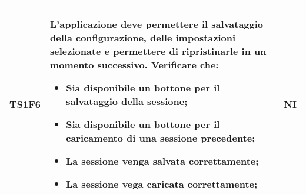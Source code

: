 \begin{tabular}{|p{2cm}|p{4cm}|p{4cm}|}
        TS1F6 & L'applicazione deve permettere il salvataggio della configurazione, delle impostazioni selezionate e permettere di ripristinarle in un momento successivo. Verificare che: \begin{itemize}
            \item Sia disponibile un bottone per il salvataggio della sessione;
            \item Sia disponibile un bottone per il caricamento di una sessione precedente;
            \item La sessione venga salvata correttamente;
            \item La sessione vega caricata correttamente;
        \end{itemize}& NI\\ \hline
    \end{tabular}
